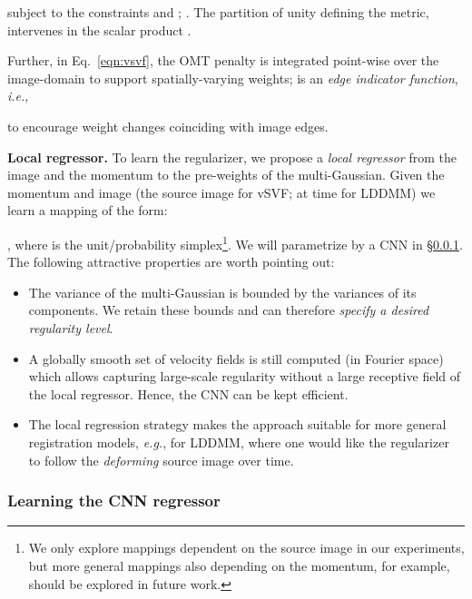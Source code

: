 \documentclass[10pt,twocolumn,letterpaper,table]{article}
\numberwithin{equation}{section}
\theoremstyle{plain}
\theoremstyle{definition}
\def\eg{\emph{e.g.}}  \def\Eg{\emph{E.g.}}
\def\ie{\emph{i.e.}}  \def\Ie{\emph{I.e.}}
\begin{document}
subject to the constraints  and ; . 
The partition of unity defining the metric, intervenes in the  scalar product . 

Further, in Eq.~\eqref{eqn:vsvf}, the OMT penalty is integrated point-wise over the image-domain to support spatially-varying weights;  is an 
\emph{edge indicator function}, \ie, 
 
to encourage weight changes coinciding with image edges. 

\noindent
\textbf{Local regressor.}
To learn the regularizer, we propose a {\it local regressor} from the image and the momentum to the pre-weights of the multi-Gaussian. Given the momentum  and image  (the source image  for vSVF;  at time  for LDDMM) we learn a mapping of the form: 
 
, where  is the  unit/probability simplex\footnote{We only explore mappings dependent on the source image  in our experiments, but more general mappings also depending on the momentum, for example, should be explored in future work.}. We will parametrize  by a CNN in  
\S\ref{subsection:cnn_regressor}. The following attractive properties are worth pointing out:
\begin{itemize}[leftmargin=14pt]
\setlength\itemsep{-1pt}
\item[1)] The variance of the multi-Gaussian is bounded by the variances of its components. We retain these bounds and can therefore \emph{specify a desired regularity level}.
\item[2)] A globally smooth set of velocity fields is still computed (in Fourier space) which allows capturing large-scale regularity without a large receptive field of the local regressor. Hence, the CNN can be kept  efficient.
  \item[3)] The local regression strategy makes the approach suitable for more general registration models, \eg, for LDDMM, where one would like the regularizer to follow the \emph{deforming} source image over time.
\end{itemize}


\subsubsection{Learning the CNN regressor}
\label{subsection:cnn_regressor}
\end{document}
